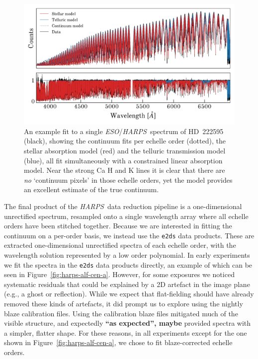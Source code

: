 \documentclass[modern]{aastex631}
\newcommand{\project}[1]{\textit{#1}}
\newcommand{\eso}{\project{ESO}}
\newcommand{\harps}{\project{HARPS}}
\newcommand{\ajw}[1]{\textbf{#1}}
\begin{document}
\begin{figure}
    \includegraphics[width=\textwidth]{example.pdf}
    \caption{An example fit to a single \eso/\harps\ spectrum of HD~222595 (black), showing the continuum fits per echelle order (dotted), the stellar absorption model (red) and the telluric transmission model (blue), all fit simultaneously with a constrained linear absorption model. Near the strong Ca H and K lines it is clear that there are \emph{no} `continuum pixels' in those echelle orders, yet the model provides an excellent estimate of the true continuum. \label{fig:example-echelle}}
\end{figure}

The final product of the \harps\ data reduction pipeline is a one-dimensional unrectified spectrum, resampled onto a single wavelength array where all echelle orders have been stitched together. Because we are interested in fitting the continuum on a per-order basis, we instead use the \texttt{e2ds} data products. These are extracted one-dimensional unrectified spectra of each echelle order, with the wavelength solution represented by a low order polynomial. In early experiments we fit the spectra in the \texttt{e2ds} data products directly, an example of which can be seen in Figure~\ref{fig:harps-alf-cen-a}. However, for some exposures we noticed systematic residuals that could be explained by a 2D artefact in the image plane (e.g., a ghost or reflection). While we expect that flat-fielding should have already removed these kinds of artefacts, it did prompt us to explore using the nightly blaze calibration files. Using the calibration blaze files mitigated much of the visible structure, and expectedly \ajw{``as expected'', maybe} provided spectra with a simpler, flatter shape. For these reasons, in all experiments except for the one shown in Figure~\ref{fig:harps-alf-cen-a}, we chose to fit blaze-corrected echelle orders.\\
\end{document}
